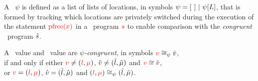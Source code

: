 
\begin{definition}[$\psi$] 
\label{Def: psi}
A \LocMap\ $\psi$ is defined as a list of lists of locations, in symbols $\psi = [\ ]\ |\ \psi[L]$,
that is formed by tracking which locations are privately switched during the execution of the statement $\textcolor{red}{\mathrm{pfree}(x)}$ in a \piccoC\ program $\textcolor{red}{s}$ to enable comparison with the \emph{congruent} \vanillaC\ program $\hat{s}$. 
\end{definition}



\begin{definition}[$\rval \Pcong \hval$]
\label{Def: val psi cong}
A \piccoC\ value and \vanillaC\ value are \emph{$\psi$-congruent}, 
in symbols $\rval \Pcong \hval$, \\
if and only if either 
$\textcolor{red}{v} \neq (\textcolor{red}{l}, \textcolor{red}{\mu})$, $\hat{v} \neq (\hat{l}, \hat{\mu})$ and $\textcolor{red}{v} \cong \hat{v}$, \\
or 
$\textcolor{red}{v} = (\textcolor{red}{l}, \textcolor{red}{\mu})$, $\hat{v} = (\hat{l}, \hat{\mu})$ and $(\textcolor{red}{l}, \textcolor{red}{\mu}) \cong_{\psi} (\hat{l}, \hat{\mu})$. 
\end{definition}




